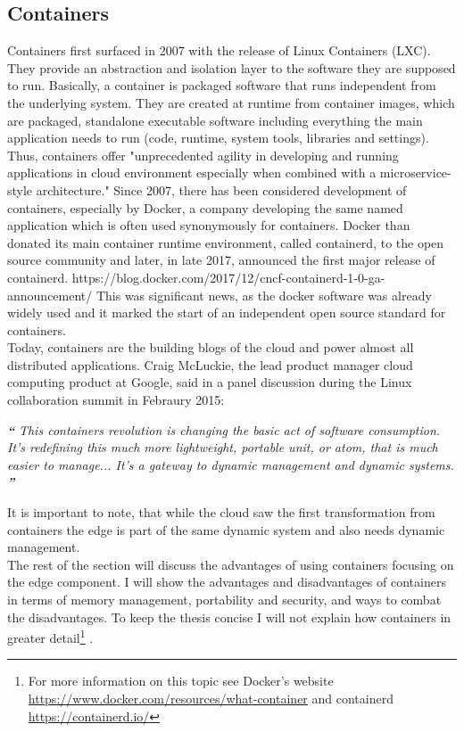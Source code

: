 \subsection{Containers}
Containers first surfaced in 2007 with the release of Linux Containers (LXC). They provide an abstraction and isolation layer to the software they are supposed to run. Basically, a container is packaged software that runs independent from the underlying system. They are created at runtime from container images, which are packaged, standalone executable software including everything the main application needs to run (code, runtime, system tools, libraries and settings)\cite{containerDefinition:online}. Thus, containers offer
"unprecedented agility in developing and running applications in cloud environment especially when combined with a microservice-style architecture."\cite{microserviceContainers} Since 2007, there has been considered development of containers, especially by Docker, a company developing the same named application which is often used synonymously for containers. Docker than donated its main container runtime environment, called containerd, to the open source community and later, in late 2017, announced the first major release of containerd. https://blog.docker.com/2017/12/cncf-containerd-1-0-ga-announcement/ This was significant news, as the docker software was already widely used and it marked the start of an independent open source standard for containers. \\
Today, containers are the building blogs of the cloud and power almost all distributed applications. Craig McLuckie, the lead product manager cloud computing product at Google, said in a panel discussion during the Linux collaboration summit in Febraury 2015:
\begin{displayquote}
\textit{\textbf{\large{``}}}
\textit{This containers revolution is changing the basic act of software consumption. It’s redefining this much more lightweight, portable unit, or atom, that is much easier to manage... It’s a gateway to dynamic management and dynamic systems.}
\textit{\textbf{\large{''}}}
\end{displayquote}
It is important to note, that while the cloud saw the first transformation from containers the edge is part of the same dynamic system and also needs dynamic management.\\ 
The rest of the section will discuss the advantages of using containers focusing on the edge component. I will show the advantages and disadvantages of containers in terms of memory management, portability and security, and ways to combat the disadvantages. To keep the thesis concise I will not explain how containers in greater detail\footnote{For more information on this topic see Docker's website  \url{https://www.docker.com/resources/what-container} and containerd \url{https://containerd.io/}} .

